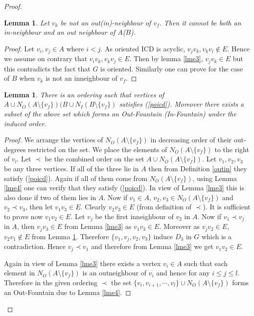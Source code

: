 \documentclass{article}
\newtheorem{lem}[thm]{Lemma}
\theoremstyle{definition}
\numberwithin{equation}{section}
\begin{document}
\begin{proof}
\begin{lem}\label{lme5}
Let $v_{k}$ be not an out(in)-neighbour of $v_{f}.$ Then it cannot be both an in-neighbour and an out neighbour of $A$($B$).
\end{lem}

\begin{proof}
Let $v_{i},v_{j}\in A$ where $i<j$. As oriented ICD is acyclic, $v_{j}v_{k},v_{k}v_{i}\notin E$. Hence we assume on contrary that $v_{i}v_{k},v_{k}v_{j}\in E$. Then by lemma \ref{lme3}, $v_{j}v_{k}\in E$ but this contradicts the fact that $G$ is oriented. Similarly one can prove for the case of $B$ when $v_{k}$ is not an inneighbour of $v_{f}$.
\end{proof}


\begin{lem}\label{lme6}
There is an ordering such that vertices of $A\cup N_{O}(A\setminus\{v_{f}\}) 
(B\cup N_{I}(B\setminus \{v_{f}\})$ satisfies (\ref{poicd}). Moreover there exists a subset of the above set which forms an Out-Fountain (In-Fountain) under the induced order. 
\end{lem}

\begin{proof}
We arrange the vertices of $N_{O}(A\setminus \{v_{f}\})$ in decreasing order of their out-degrees restricted on the set. We place the elements of $N_{O}(A\setminus \{v_{f}\})$ to the right of $v_{l}$. Let $\prec$ be the combined order on the set $A\cup N_{O}(A\setminus\{v_{f}\})$. Let $v_{1},v_{2},v_{3}$ be any three vertices.
If all of the three lie in $A$ then from Definition \ref{outin} they satisfy (\ref{poicd}). Again if all of them come from $N_{O}(A\setminus\{v_{f}\})$, using Lemma \ref{lme4} one can verify that they satisfy (\ref{poicd}). In view of Lemma \ref{lme3} this is also done if two of them lies in $A$. Now if $v_{1}\in A$, $v_{2},v_{3}\in N_{O}(A\setminus \{v_{f}\})$ and $v_{2}\prec v_{3}$, then let $v_{1}v_{3}\in E$. Clearly $v_{2}v_{3}\in E$ (from definition of $\prec$). It is sufficient to prove now $v_{1}v_{2}\in E$. Let $v_{j}$ be the first inneighbour of $v_{2}$ in $A$. Now if $v_{1}\prec v_{j}$ in $A$, then $v_{j}v_{3}\in E$ from Lemma \ref{lme3} as $v_{1}v_{3}\in E$. Moreover as $v_{j}v_{2}\in E$, $v_{2}v_{1}\notin E$ from Lemma \ref{lme5}. Therefore $\{v_{1},v_{j},v_{2},v_{3}\}$ induce $D_{3}$ in $G$ which is a contradiction. Hence $v_{j}\prec v_{1}$ and therefore from Lemma \ref{lme3} we get $v_{1}v_{2}\in E$.

\noindent Again in view of Lemma \ref{lme3} there exists a vertex $v_{i}\in A$ such that each element in $N_{O}(A\setminus \{v_{f}\})$ is an outneighbour of $v_{i}$ and hence for any $i\leq j\leq l.$ Therefore in the given ordering $\prec$ the set $\{v_{i},v_{i+1},\cdots , v_{l}\}\cup N_{O}(A\setminus \{v_{f}\})$ forms an Out-Fountain due to Lemma \ref{lme4}.  


\end{proof}
\end{proof}
\end{document}
